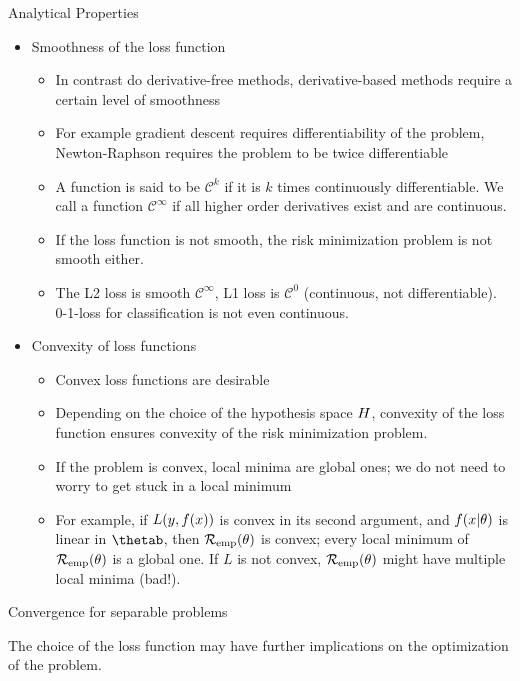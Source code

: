 \begin{vbframe}{Analytical Properties}




\begin{itemize}
  \item Smoothness of the loss function \\
  \begin{itemize}
    \item In contrast do derivative-free methods, derivative-based methods require a certain level of smoothness  
    \item For example gradient descent requires differentiability of the problem, Newton-Raphson requires the problem to be twice differentiable
    \item A function is said to be $\mathcal{C}^k$ if it is $k$ times continuously differentiable. We call a function $\mathcal{C}^\infty$ if all higher order derivatives exist and are continuous. 
    \item If the loss function is not smooth, the risk minimization problem is not smooth either. 
    \item The L2 loss is smooth $\mathcal{C}^\infty$, L1 loss is $\mathcal{C}^0$ (continuous, not differentiable). 0-1-loss for classification is not even continuous. 
  \end{itemize}
  \framebreak 
  \item Convexity of loss functions
  \begin{itemize}
    \item Convex loss functions are desirable 
    \item Depending on the choice of the hypothesis space $H$, convexity of the loss function ensures convexity of the risk minimization problem. 
    \item If the problem is convex, local minima are global ones; we do not need to worry to get stuck in a local minimum
    \item For example, if $L(y, f(x))$ is convex in its second argument, and $f(x | \theta)$ is linear in $\thetab$, then $\mathcal{R}_{\text{emp}}(\theta)$ is convex; every local minimum of $\mathcal{R}_{\text{emp}}(\theta)$ is a global one. If $L$ is not convex, $\mathcal{R}_{\text{emp}}(\theta)$ might have multiple local minima (bad!).
  \end{itemize} 
\end{itemize}


\end{vbframe}

\begin{vbframe}{Convergence for separable problems}

The choice of the loss function may have further implications on the optimization of the problem. 


\end{vbframe}



